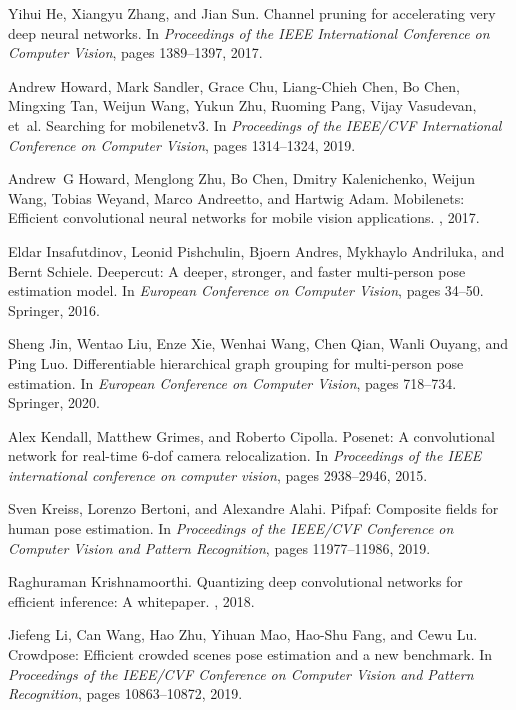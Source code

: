 \documentclass[10pt,twocolumn,letterpaper]{article}
\begin{document}
{\begin{thebibliography}{10}
Yihui He, Xiangyu Zhang, and Jian Sun.
\newblock Channel pruning for accelerating very deep neural networks.
\newblock In {\em Proceedings of the IEEE International Conference on Computer
  Vision}, pages 1389--1397, 2017.

Andrew Howard, Mark Sandler, Grace Chu, Liang-Chieh Chen, Bo Chen, Mingxing
  Tan, Weijun Wang, Yukun Zhu, Ruoming Pang, Vijay Vasudevan, et~al.
\newblock Searching for mobilenetv3.
\newblock In {\em Proceedings of the IEEE/CVF International Conference on
  Computer Vision}, pages 1314--1324, 2019.

Andrew~G Howard, Menglong Zhu, Bo Chen, Dmitry Kalenichenko, Weijun Wang,
  Tobias Weyand, Marco Andreetto, and Hartwig Adam.
\newblock Mobilenets: Efficient convolutional neural networks for mobile vision
  applications.
, 2017.

Eldar Insafutdinov, Leonid Pishchulin, Bjoern Andres, Mykhaylo Andriluka, and
  Bernt Schiele.
\newblock Deepercut: A deeper, stronger, and faster multi-person pose
  estimation model.
\newblock In {\em European Conference on Computer Vision}, pages 34--50.
  Springer, 2016.

Sheng Jin, Wentao Liu, Enze Xie, Wenhai Wang, Chen Qian, Wanli Ouyang, and Ping
  Luo.
\newblock Differentiable hierarchical graph grouping for multi-person pose
  estimation.
\newblock In {\em European Conference on Computer Vision}, pages 718--734.
  Springer, 2020.

Alex Kendall, Matthew Grimes, and Roberto Cipolla.
\newblock Posenet: A convolutional network for real-time 6-dof camera
  relocalization.
\newblock In {\em Proceedings of the IEEE international conference on computer
  vision}, pages 2938--2946, 2015.

Sven Kreiss, Lorenzo Bertoni, and Alexandre Alahi.
\newblock Pifpaf: Composite fields for human pose estimation.
\newblock In {\em Proceedings of the IEEE/CVF Conference on Computer Vision and
  Pattern Recognition}, pages 11977--11986, 2019.

Raghuraman Krishnamoorthi.
\newblock Quantizing deep convolutional networks for efficient inference: A
  whitepaper.
, 2018.

Jiefeng Li, Can Wang, Hao Zhu, Yihuan Mao, Hao-Shu Fang, and Cewu Lu.
\newblock Crowdpose: Efficient crowded scenes pose estimation and a new
  benchmark.
\newblock In {\em Proceedings of the IEEE/CVF Conference on Computer Vision and
  Pattern Recognition}, pages 10863--10872, 2019.


\end{thebibliography}}
\end{document}
